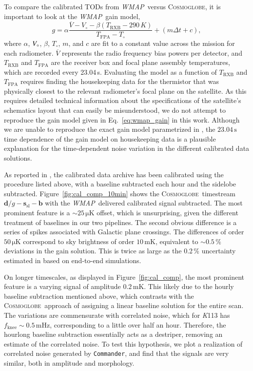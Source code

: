 \documentclass[twocolumn]{../../common/aa}
\def\WMAP{\emph{WMAP}}
\def\commander{\texttt{Commander}}
\newcommand{\cosmoglobe}{\textsc{Cosmoglobe}}
\newcommand{\K}[0]{\textit K}
\newcommand{\V}[0]{\textit V}
\begin{document}
To compare the calibrated TODs from \WMAP\ versus \cosmoglobe, it is  important to look at the \WMAP\ gain model,
\begin{equation}
	\label{eq:wmap_gain}
	g=\alpha\frac{\overline V-V_\circ-\beta(T_\mathrm{RXB}-290\,K)}
	{T_\mathrm{FPA}-T_\circ}+(m\Delta t+c),
\end{equation}
where $\alpha$, $\V_\circ$, $\beta$, $T_\circ$, $m$, and $c$ are fit to a constant value across the mission for each radiometer. $\overline V$ represents the radio frequency bias powers per detector, and $T_\mathrm{RXB}$ and $T_\mathrm{FPA}$ are the receiver box and focal plane assembly temperatures, which are recorded every 23.04\,s. 
Evaluating the model as a function of $T_\mathrm{RXB}$ and $T_\mathrm{FPA}$ requires finding the housekeeping data for the thermistor that was physically closest to the relevant radiometer's focal plane on the satellite. As this requires detailed technical information about the specifications of the satellite's schematics layout that can easily be misunderstood, we do not attempt to reproduce the gain model given in Eq.~\eqref{eq:wmap_gain} in this work.
Although we are unable to reproduce the exact gain model parametrized in \citet{wmapexsupp}, the $23.04\,\mathrm s$ time dependence of the gain model on housekeeping data is a plausible explanation for the time-dependent noise variation in the different calibrated data solutions.

As reported in \citet{hinshaw2007}, the calibrated data archive has been calibrated using the procedure listed above, with a baseline subtracted each hour and the sidelobe subtracted. Figure~\ref{fig:cal_comp_10min} shows the \cosmoglobe\ timestream $\boldsymbol d/g-\boldsymbol s_\mathrm{sl}-\boldsymbol b$ with the \WMAP\ delivered calibrated signal subtracted. The most prominent feature is a $\sim25\,\mathrm{\mu K}$ offset, which is unsurprising, given the different treatment of baselines in our two pipelines. The second obvious difference is a series of spikes associated with Galactic plane crossings. The differences of order $50\,\mathrm{\mu K}$ correspond to sky brightness of order $10\,\mathrm{mK}$, equivalent to $\sim0.5\,\%$ deviations in the gain solution. This is twice as large as the 0.2\,\% uncertainty estimated in \citet{bennett2012} based on end-to-end simulations.

On longer timescales, as displayed in Figure~\ref{fig:cal_comp}, the most prominent feature is a varying signal of amplitude $0.2\,\mathrm{mK}$. This likely due to the hourly baseline subtraction mentioned above, which contrasts with the \cosmoglobe\ approach of assigning a linear baseline solution for the entire scan. The variations are commensurate with correlated noise, which for \K113 has ${f_\mathrm{knee}\sim0.5\,\mathrm{mHz}}$, corresponding to a little over half an hour. Therefore, the hourlong baseline subtraction essentially acts as a destriper, removing an estimate of the correlated noise. To test this hypothesis, we plot a realization of correlated noise generated by \commander, and find that the signals are very similar, both in amplitude and morphology.
\end{document}
